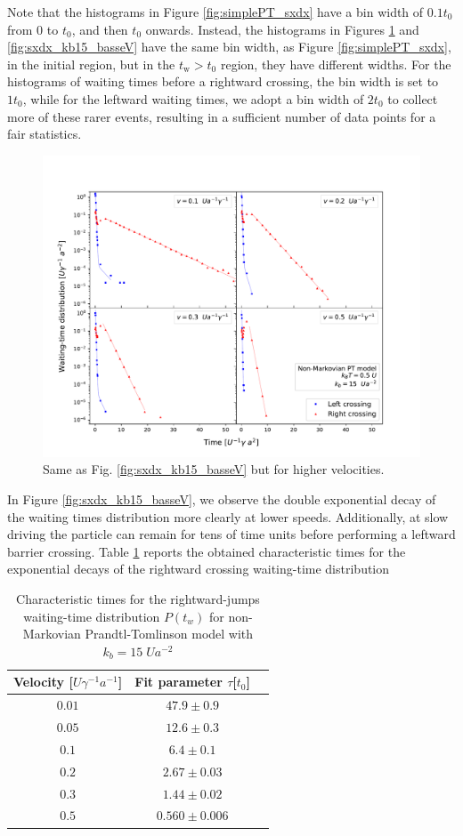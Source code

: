 Note that the histograms in Figure \ref{fig:simplePT_sxdx} have a bin width of $0.1 t_0$ from $0$ to $ t_0$, and then $t_0$ onwards. Instead, the histograms in Figures \ref{fig:sxdx_kb15_alteV} and \ref{fig:sxdx_kb15_basseV} have the same bin width, as Figure \ref{fig:simplePT_sxdx}, in the initial region, but in the $t_\text{w}>t_0$ region, they have different widths. For the histograms of waiting times before a rightward crossing, the bin width is set to $1 t_0$, while for the leftward waiting times, we adopt a bin width of $2 t_0$ to collect more of these rarer events, resulting in a sufficient number of data points for a fair statistics.
\begin{figure}
    \centering
    \includegraphics[width=\textwidth]{isto_sxdx_kb15_alteV.pdf}
    \caption{Same as Fig. \ref{fig:sxdx_kb15_basseV} but for higher velocities.}
    \label{fig:sxdx_kb15_alteV}
\end{figure}
\newpage
\noindent In Figure \ref{fig:sxdx_kb15_basseV}, we observe the double exponential decay of the waiting times distribution more clearly at lower speeds. Additionally, at slow driving the particle can remain for tens of time units before performing a leftward barrier crossing. Table \ref{tab:sxdx_right} reports the obtained characteristic times for the exponential decays of the rightward crossing waiting-time distribution
\begin{table}
\centering 
\begin{tabular}{ccc}
    \toprule
    Velocity [$U \gamma ^{-1} a^{-1}$] & Fit parameter $\tau $[$t_0$] \\
    \midrule 
    $0.01$ & $47.9 \pm 0.9$\\
    $0.05$ & $12.6 \pm 0.3$\\
    $0.1$ & $6.4 \pm 0.1$ \\
    $0.2$ & $2.67 \pm 0.03$ \\
    $0.3$ & $1.44 \pm 0.02$ \\
    $0.5$ & $0.560 \pm 0.006$ \\
    \bottomrule
\end{tabular}
\caption{Characteristic times for the rightward-jumps waiting-time distribution $P(t_w)$ for non-Markovian Prandtl-Tomlinson model with $k_b=15\; Ua^{-2}$}
\label{tab:sxdx_right}
\end{table}
